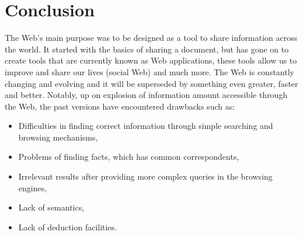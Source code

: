 \newpage %
\section*{Conclusion}

The Web's main purpose was to be designed as a tool to share information across the world. It started with the basics of sharing a document, but has gone on to create tools that are currently known as Web applications, these tools allow us to improve and share our lives (social Web) and much more. The Web is constantly changing and evolving and it will be superseded by something even greater, faster and better. Notably, up on explosion of information amount accessible through the Web, the past versions have encountered drawbacks such as:


\begin{itemize}
    \setlength{\itemsep}{0cm}
    \setlength{\parskip}{0cm}

    \item Difficulties in finding correct information through simple searching and browsing mechanisms,
    \item Problems of finding facts, which has common correspondents,
    \item Irrelevant results after providing more complex queries in the browsing engines,
    \item Lack of semantics,
    \item Lack of deduction facilities.
\end{itemize}







